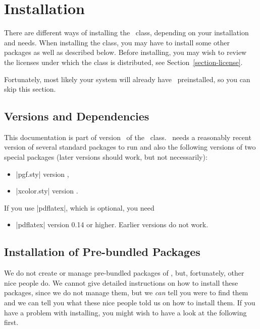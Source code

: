 %
%
%

\section{Installation}
\label{section-installation}

There are different ways of installing the \beamer\ class, depending on your installation and needs. When installing the class, you may have to install some other packages as well as described below. Before installing, you may wish to review the licenses under which the class is distributed, see Section~\ref{section-license}.

Fortunately, most likely your system will already have \beamer\ preinstalled, so you can skip this section.


\subsection{Versions and Dependencies}

This documentation is part of version \beamerugversion\ of the \beamer\ class. \beamer\ needs a reasonably recent version of several standard packages to run and also the following versions of two special packages (later versions should work, but not necessarily):
\begin{itemize}
\item
  |pgf.sty| version \beamerugpgfversion,
\item
  |xcolor.sty| version \beamerugxcolorversion.
\end{itemize}

If you use |pdflatex|, which is optional, you need
\begin{itemize}
\item
  |pdflatex| version 0.14 or higher. Earlier versions do not work.
\end{itemize}


\subsection{Installation of Pre-bundled Packages}

We do not create or manage pre-bundled packages of \beamer, but, fortunately, other nice people do. We cannot give detailed instructions on how to install these packages, since we do not manage them, but we \emph{can} tell you were to find them and we can tell you what these nice people told us on how to install them. If you have a problem with installing, you might wish to have a look at the following first.


